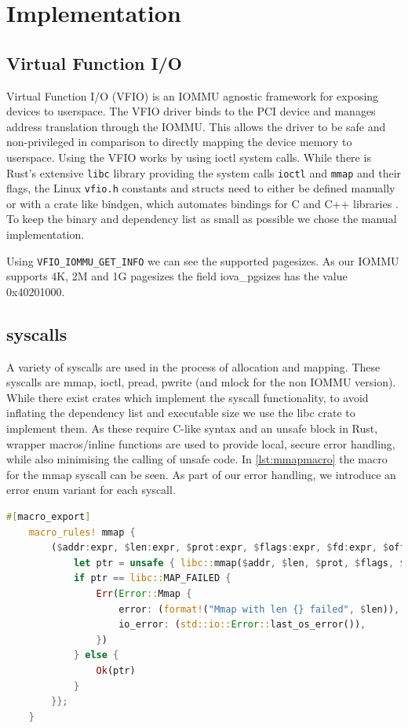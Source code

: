 \chapter{Implementation}

\section{Virtual Function I/O}
Virtual Function I/O (VFIO) is an IOMMU agnostic framework for exposing devices to userspace.
The VFIO driver binds to the PCI device and manages address translation through the IOMMU.
This allows the driver to be safe and non-privileged in comparison to directly mapping the device memory to userspace.
Using the VFIO works by using ioctl system calls.
While there is Rust's extensive \texttt{libc} library providing the system calls \texttt{ioctl} and \texttt{mmap} and their flags, the Linux \texttt{vfio.h} constants and structs need to either be defined manually or with a crate like bindgen, which automates bindings for C and C++ libraries \cite{cratebindgen}. To keep the binary and dependency list as small as possible we chose the manual implementation.

Using \texttt{VFIO\_IOMMU\_GET\_INFO} we can see the supported pagesizes. As our IOMMU supports 4K, 2M and 1G pagesizes the field iova\_pgsizes has the value 0x40201000.

\section{syscalls}
A variety of syscalls are used in the process of allocation and mapping. These syscalls are mmap, ioctl, pread, pwrite (and mlock for the non IOMMU version). While there exist crates which implement the syscall functionality, to avoid inflating the dependency list and executable size we use the libc crate to implement them. As these require C-like syntax and an unsafe block in Rust, wrapper macros/inline functions are used to provide local, secure error handling, while also minimising the calling of unsafe code. In \autoref{lst:mmapmacro} the macro for the mmap syscall can be seen.
As part of our error handling, we introduce an error enum variant for each syscall.

\begin{lstlisting}[language=Rust, label=lst:mmapmacro]
    #[macro_export]
    macro_rules! mmap {
        ($addr:expr, $len:expr, $prot:expr, $flags:expr, $fd:expr, $offset:expr) => {{
            let ptr = unsafe { libc::mmap($addr, $len, $prot, $flags, $fd, $offset) };
            if ptr == libc::MAP_FAILED {
                Err(Error::Mmap {
                    error: (format!("Mmap with len {} failed", $len)),
                    io_error: (std::io::Error::last_os_error()),
                })
            } else {
                Ok(ptr)
            }
        }};
    } 
\end{lstlisting}

